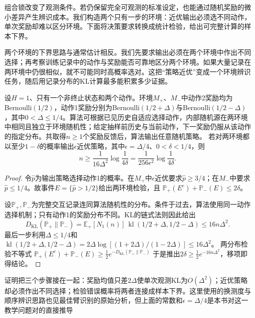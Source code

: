 组合锁改变了观测条件。若仍保留完全可观测的标准设定，也能通过随机奖励的微小差异产生辨识成本。我们构造两个只有一步的环境：近优输出必须选不同动作，单次奖励却难以区分环境。下面将决策要求转换成统计检验，给出可完整计算的样本下界。

两个环境的下界思路与通常估计相反。我们先要求输出必须在两个环境中作出不同选择；再考察训练记录中的动作与奖励能否可靠地区分两个环境。如果大量记录在两环境中仍很相似，就不可能同时高概率选对。这把“策略近优”变成一个环境辨识任务，随后用记录分布的KL计算最多能积累多少证据。

\begin{theorem}[一步决策的辨识下界]
  \label{thm:rl-learning-two-instance-lower}
  设$H=1$、只有一个非终止状态和两个动作。环境$M_+$、$M_-$中动作2奖励均为Bernoulli$(1/2)$，动作1奖励分别为Bernoulli$(1/2+\Delta)$与Bernoulli$(1/2-\Delta)$，其中$0<\Delta\leq1/4$。算法可根据已见历史自适应选择动作，内部随机源在两环境中相同且独立于环境随机性；给定抽样前历史与当前动作，下一奖励仍服从该动作的指定分布。共取得$n\geq1$个奖励反馈后，算法输出任意随机策略。
  若对两环境都以至少$1-\delta$的概率输出$\epsilon$近优策略，其中$\epsilon=\Delta/4$、$0<\delta<1/4$，则
  \[
     n\geq\frac{1}{16\Delta^2}\log\frac1{4\delta}
       =\frac{1}{256\epsilon^2}\log\frac1{4\delta}.
  \]
\end{theorem}

\begin{proof}
  令$\widehat p$为输出策略选择动作1的概率。在$M_+$中$\epsilon$近优要求$\widehat p\geq3/4$；在$M_-$中要求$\widehat p\leq1/4$。故事件$E=\{\widehat p>1/2\}$给出两环境检验，且
  $\mathbb P_+(E^c)+\mathbb P_-(E)\leq2\delta$。

  设$\mathbb P_+,\mathbb P_-$为完整交互记录连同算法随机性的分布。条件于过去，算法使用同一动作选择机制；只有动作1的奖励分布不同。KL的链式法则因此给出
  \[
   D_{\mathrm{KL}}(\mathbb P_+\|\mathbb P_-)
    =\mathbb E_+[N_1(n)]\,
       \operatorname{kl}(1/2+\Delta,1/2-\Delta)
    \leq16n\Delta^2.
  \]
  最后一步利用$\Delta\leq1/4$和
  $\operatorname{kl}(1/2+\Delta,1/2-\Delta)
   =2\Delta\log[(1+2\Delta)/(1-2\Delta)]\leq16\Delta^2$。
  两分布检验不等式
  $\mathbb P_+(E^c)+\mathbb P_-(E)
       \geq\tfrac12e^{-D_{\mathrm{KL}}(\mathbb P_+\|\mathbb P_-)}$
  于是推出$2\delta\geq\tfrac12e^{-16n\Delta^2}$，移项即得结论。
\end{proof}

证明把三个步骤接在一起：奖励均值只差$2\Delta$使单次观测KL为$O(\Delta^2)$；近优策略却必须作出不同选择；检验错误概率将两者连接成样本下界。这里使用的换测度与顺序辨识思路也见最佳臂识别的原始分析，但上面的常数和$\epsilon=\Delta/4$是本书对这一教学问题对的直接推导

